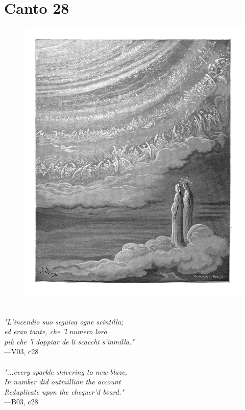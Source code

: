 \documentclass[../Dore_vision.tex]{subfiles}
\begin{document}
\newpage

\section{Canto 28}

\begin{figure}[ht]
\centering
\includegraphics[height=\figsize]{illustrations/book_3/V03, c28.jpg}
\end{figure}

\begin{center}
\begin{minipage}{0.8\linewidth}
\textit{\\
"L’incendio suo seguiva ogne scintilla;\\ed eran tante, che ’l numero loro\\più che ’l doppiar de li scacchi s’inmilla."} \\
—V03, c28 \\~\\
\textit{"...every sparkle shivering to new blaze,\\In number did outmillion the account\\Reduplicate upon the chequer'd board."} \\
—B03, c28
\end{minipage}
\end{center}
\end{document}
